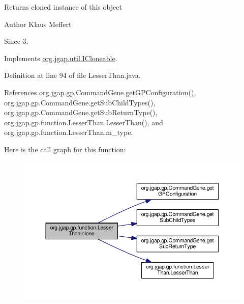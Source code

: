 \begin{DoxyReturn}{Returns}
cloned instance of this object
\end{DoxyReturn}
\begin{DoxyAuthor}{Author}
Klaus Meffert 
\end{DoxyAuthor}
\begin{DoxySince}{Since}
3. 
\end{DoxySince}


Implements \hyperlink{interfaceorg_1_1jgap_1_1util_1_1_i_cloneable_aa7e7d62077e6428ad7904932b1b4f7d5}{org.\-jgap.\-util.\-I\-Cloneable}.



Definition at line 94 of file Lesser\-Than.\-java.



References org.\-jgap.\-gp.\-Command\-Gene.\-get\-G\-P\-Configuration(), org.\-jgap.\-gp.\-Command\-Gene.\-get\-Sub\-Child\-Types(), org.\-jgap.\-gp.\-Command\-Gene.\-get\-Sub\-Return\-Type(), org.\-jgap.\-gp.\-function.\-Lesser\-Than.\-Lesser\-Than(), and org.\-jgap.\-gp.\-function.\-Lesser\-Than.\-m\-\_\-type.



Here is the call graph for this function\-:
\nopagebreak
\begin{figure}[H]
\begin{center}
\leavevmode
\includegraphics[width=350pt]{classorg_1_1jgap_1_1gp_1_1function_1_1_lesser_than_a283593c6ae169e134630507c3416080c_cgraph}
\end{center}
\end{figure}


